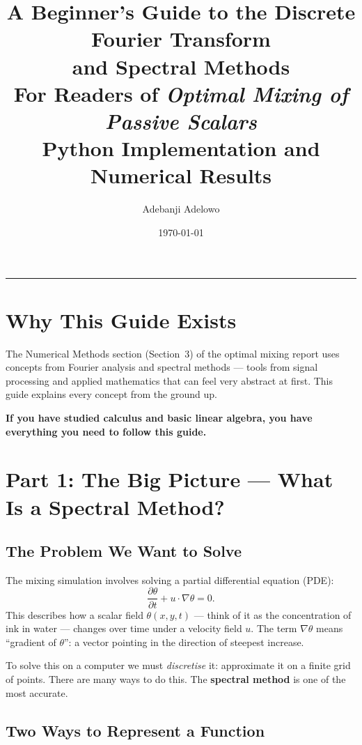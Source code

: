\documentclass[12pt,a4paper]{article}
\title{%
  \textbf{A Beginner's Guide to the Discrete Fourier Transform\\
  and Spectral Methods}\\[8pt]
  \large For Readers of \textit{Optimal Mixing of Passive Scalars}\\[4pt]
  \normalsize Python Implementation and Numerical Results
}
\author{Adebanji Adelowo}
\date{\today}
\theoremstyle{definition}
\begin{document}
\maketitle
\tableofcontents
\bigskip\hrule\bigskip

\section*{Why This Guide Exists}

The Numerical Methods section (Section~3) of the optimal mixing report uses
concepts from Fourier analysis and spectral methods — tools from signal
processing and applied mathematics that can feel very abstract at first.
This guide explains every concept from the ground up.

\begin{insightbox}
\textbf{If you have studied calculus and basic linear algebra, you have
everything you need to follow this guide.}
\end{insightbox}

\section{Part 1: The Big Picture — What Is a Spectral Method?}

\subsection{The Problem We Want to Solve}

The mixing simulation involves solving a partial differential equation (PDE):
\begin{equation}
  \frac{\partial \theta}{\partial t} + u \cdot \nabla \theta = 0.
\end{equation}
This describes how a scalar field $\theta(x,y,t)$ — think of it as the
concentration of ink in water — changes over time under a velocity field $u$.
The term $\nabla\theta$ means ``gradient of $\theta$'': a vector pointing in
the direction of steepest increase.

To solve this on a computer we must \emph{discretise} it: approximate it on a
finite grid of points.  There are many ways to do this.  The
\textbf{spectral method} is one of the most accurate.

\subsection{Two Ways to Represent a Function}
\end{document}
